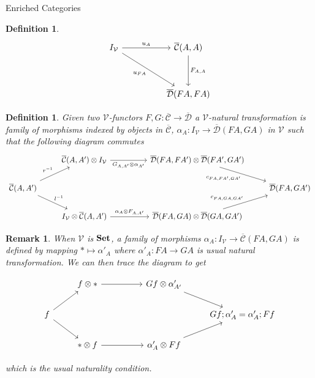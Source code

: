 \documentclass[acmsmall, screen, nonacm]{acmart}
\newtheorem{definition}[theorem]{Definition}
\newtheorem{remark}[theorem]{Remark}
\newcommand\enriched[1]{{\overline{\mathcal{#1}}}}
\begin{document}
\begin{section}{Enriched Categories}
\begin{definition}
\[
\begin{tikzcd}
	I_{\mathcal{V}} && {\enriched{C}(A,A)} \\
	\\
	&& {\enriched{D}(FA,FA)}
	\arrow["{u_{A}}", from=1-1, to=1-3]
	\arrow["{u_{FA}}"', from=1-1, to=3-3]
	\arrow["{F_{A,A}}", from=1-3, to=3-3]
\end{tikzcd}
\]
\end{definition}

\begin{definition}
  Given two $\mathcal{V}$-functors $F,G : \enriched{C} \to \enriched{D}$ a $\mathcal{V}$-natural transformation is family of morphisms indexed by objects in $\enriched{C}$, $\alpha_{A} : I_{\mathcal{V}} \to \enriched{D}(FA,GA)$ in $\mathcal{V}$ such that the following diagram commutes
  \[
  \begin{tikzcd}
	& {\enriched{C}(A,A')\otimes I_{\mathcal{V}}} && {\enriched{D}(FA,FA') \otimes \enriched{D}(FA',GA')} \\
	{\enriched{C}(A,A')} &&&& {\enriched{D}(FA,GA')} \\
	& {I_{\mathcal{V}} \otimes \enriched{C}(A,A')} && {\enriched{D}(FA,GA) \otimes \enriched{D}(GA,GA')}
	\arrow["{G_{A,A'}\otimes \alpha_{A'}}"', from=1-2, to=1-4]
	\arrow["{c_{FA,FA',GA'}}"', from=1-4, to=2-5]
	\arrow["{r^{-1}}", from=2-1, to=1-2]
	\arrow["{l^{-1}}", from=2-1, to=3-2]
	\arrow["{\alpha_{A} \otimes F_{A,A'}}", from=3-2, to=3-4]
	\arrow["{c_{FA,GA,GA'}}", from=3-4, to=2-5]
\end{tikzcd}
\]
\end{definition}

\begin{remark}
  When $\mathcal{V}$ is $\mathbf{Set}$, a family of morphisms $\alpha_{A} : I_{\mathcal{V}} \to \enriched{C}(FA,GA)$ is defined by mapping $* \mapsto \alpha'_{A}$ where $\alpha'_{A} : FA \to GA$ is usual natural transformation.
  We can then trace the diagram to get

\[\begin{tikzcd}
	& {f \otimes *} && {Gf \otimes \alpha'_{A'}} \\
	f &&&& {Gf;\alpha'_{A} = \alpha'_{A};Ff} \\
	& {* \otimes f} && {\alpha'_{A} \otimes Ff}
	\arrow[from=1-2, to=1-4]
	\arrow[from=1-4, to=2-5]
	\arrow[from=2-1, to=1-2]
	\arrow[from=2-1, to=3-2]
	\arrow[from=3-2, to=3-4]
	\arrow[from=3-4, to=2-5]
\end{tikzcd}\]

which is the usual naturality condition.


\end{remark}
\end{section}
\end{document}
